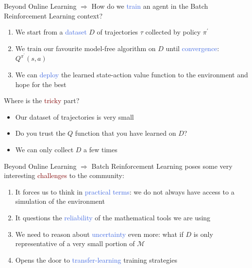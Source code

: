 \documentclass{beamer}
\newcommand{\xmark}{\ding{55}}
\begin{document}
\begin{frame}{Beyond Online Learning}
	$\Rightarrow$ How do we \textcolor{RoyalBlue}{train} an agent in the Batch Reinforcement Learning context?
	
	\begin{enumerate}
		\item We start from a \textcolor{RoyalBlue}{dataset} $D$ of trajectories $\tau$ collected by policy $\pi^{\prime}$
		\item We train our favourite model-free algorithm on $D$ until \textcolor{RoyalBlue}{convergence}: $Q^{\pi^{\prime}}(s,a)$
		\item We can \textcolor{RoyalBlue}{deploy} the learned state-action value function to the environment and hope for the best
	\end{enumerate}

	\bigskip

	Where is the \textcolor{Maroon}{tricky} part?
	\begin{itemize}
		\item Our dataset of trajectories is very small \textcolor{red}{\xmark}
		\item Do you trust the $Q$ function that you have learned on $D$? \textcolor{red}{\xmark}
		\item We can only collect $D$ a few times \textcolor{red}{\xmark}
	\end{itemize}

\end{frame}

\begin{frame}{Beyond Online Learning}
	$\Rightarrow$ Batch Reinforcement Learning  poses some very interesting \textcolor{Maroon}{challenges} to the community:
	\begin{enumerate}
		\item It forces us to think in \textcolor{RoyalBlue}{practical terms}: we do not always have access to a simulation of the environment
		\item It questions the \textcolor{RoyalBlue}{reliability} of the mathematical tools we are using
		\item We need to reason about \textcolor{RoyalBlue}{uncertainty} even more: what if $D$ is only representative of a very small portion of $\mathcal{M}$
		\item Opens the door to \textcolor{RoyalBlue}{transfer-learning} training strategies
	\end{enumerate}

\end{frame}
\end{document}
